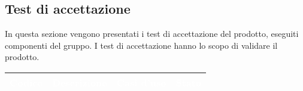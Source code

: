 \subsection{Test di accettazione}
In questa sezione vengono presentati i test di accettazione del prodotto, eseguiti  componenti del gruppo. I test di accettazione hanno lo scopo di validare il prodotto.
\begingroup
\setlength{\tabcolsep}{10pt}
\renewcommand{\arraystretch}{1.5}
\begin{xltabular}{\textwidth}{| c | X | X | c |}
    \hline
     \textbf{\textcolor{white}{Codice}} & \textbf{\textcolor{white}{Descrizione}} & \textbf{\textcolor{white}{Casi d'uso}} & \textbf{\textcolor{white}{Stato}}\\
    \hline
    \endhead
    \hline
    

\end{xltabular}
